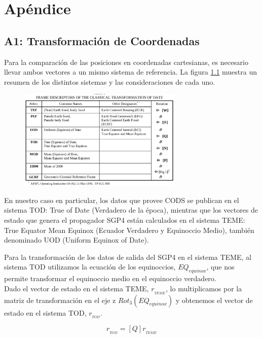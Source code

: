 \chapter{Ap\'endice}
\section{A1: Transformaci\'on de Coordenadas}
\label{App1}


Para la comparaci\'on de las posiciones en coordenadas cartesianas, es necesario llevar ambos vectores a un mismo sistema de referencia.
La figura \ref{fig:sistReferenciasAp} muestra un resumen de los distintos sistemas y las consideraciones de cada uno. 

\begin{figure}[!h]
  \centering
  \includegraphics[width=0.7\textwidth]{imagenes/sistReferencias}
  \label{fig:sistReferenciasAp}
\end{figure}

En nuestro caso en particular, los datos que provee CODS se publican en el sistema TOD: True of Date (Verdadero de la \'epoca), mientras que los vectores de estado que genera el propagador SGP4 est\'an calculados en el sistema TEME: True Equator Mean Equinox (Ecuador Verdadero y Equinoccio Medio), tambi\'en denominado UOD (Uniform Equinox of Date).

Para la transformaci\'on de los datos de salida del SGP4 en el sistema TEME, al sistema TOD utilizamos la ecuaci\'on de los equinoccios, $EQ_{equinox}$, que nos permite transformar el equinoccio medio en el equinoccio verdadero.\\
Dado el vector de estado en el sistema TEME, $r_{_{TEME}}$, lo multiplicamos por la matriz de transformaci\'on en el eje z $Rot_{3}(EQ_{equinox})$ y obtenemos el vector de estado en el sistema TOD, $r_{_{TOD}}$.

\begin{equation}
 r_{_{TOD}} = [Q] r_{_{TEME}}
\end{equation}


